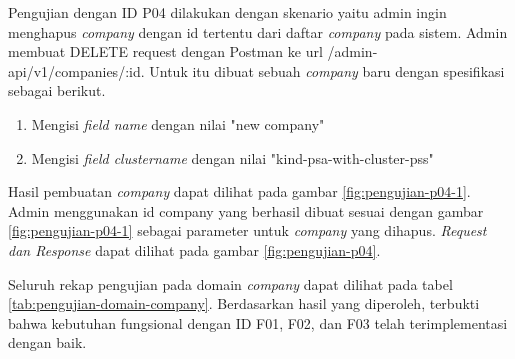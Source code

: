 Pengujian dengan ID P04 dilakukan dengan skenario yaitu admin ingin menghapus \textit{company} dengan id tertentu dari daftar \textit{company} pada sistem. Admin membuat DELETE request dengan Postman ke url /admin-api/v1/companies/:id. Untuk itu dibuat sebuah \textit{company} baru dengan spesifikasi sebagai berikut.

\begin{enumerate}
  \item Mengisi \textit{field name} dengan nilai "new company"
  \item Mengisi \textit{field cluster\textunderscore name} dengan nilai "kind-psa-with-cluster-pss"
\end{enumerate}

Hasil pembuatan \textit{company} dapat dilihat pada gambar \ref{fig:pengujian-p04-1}. Admin menggunakan id company yang berhasil dibuat sesuai dengan gambar \ref{fig:pengujian-p04-1} sebagai parameter untuk \textit{company} yang dihapus. \textit{Request dan Response} dapat dilihat pada gambar \ref{fig:pengujian-p04}.

Seluruh rekap pengujian pada domain \textit{company} dapat dilihat pada tabel \ref{tab:pengujian-domain-company}. Berdasarkan hasil yang diperoleh, terbukti bahwa kebutuhan fungsional dengan ID F01, F02, dan F03 telah terimplementasi dengan baik.
